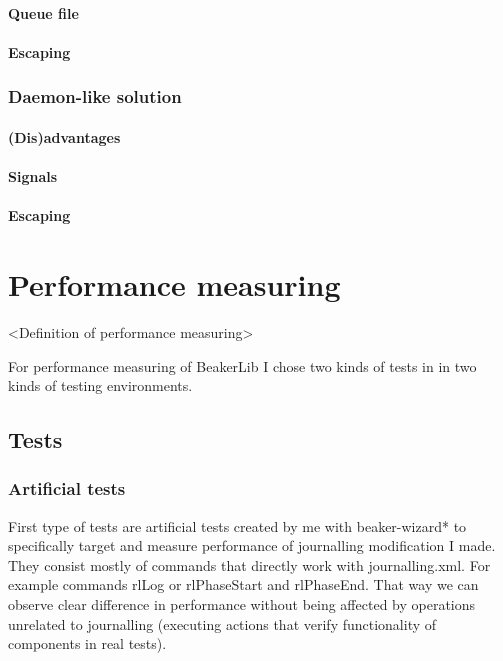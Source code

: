 \subsubsection{Queue file}

\subsubsection{Escaping}


\subsection{Daemon-like solution}

\subsubsection{(Dis)advantages}

\subsubsection{Signals}

\subsubsection{Escaping}



\chapter{Performance measuring}
<Definition of performance measuring>

For performance measuring of BeakerLib I chose two kinds of tests in in two kinds of testing environments.

\section{Tests}

\subsection{Artificial tests}
First type of tests are artificial tests created by me with beaker-wizard* to specifically target and measure performance of journalling modification I made. They consist mostly of commands that directly work with journalling.xml. For example commands rlLog or rlPhaseStart and rlPhaseEnd. That way we can observe clear difference in performance without being affected by operations unrelated to journalling (executing actions that verify functionality of components in real tests). 

